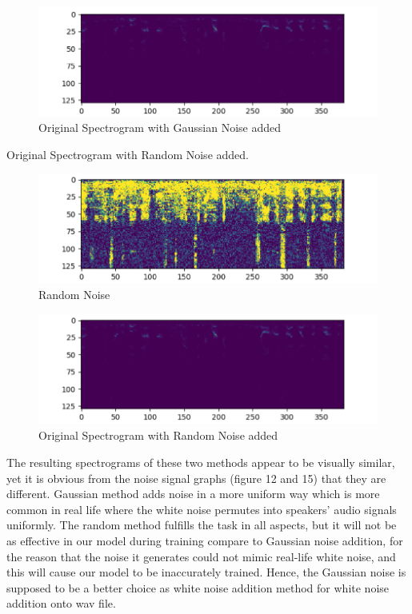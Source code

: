 \documentclass[runningheads,a4paper]{llncs}
\begin{document}
\begin{figure}[H]
\includegraphics[scale=0.25]{figureC.png}
\caption{Original Spectrogram with Gaussian Noise added}
\label{fig:framework}
\end{figure}

Original Spectrogram with Random Noise added.\\

\begin{figure}[H]
\includegraphics[scale=0.25]{figureE.png}
\caption{Random Noise}
\label{fig:framework}
\end{figure}

\begin{figure}[H]
\includegraphics[scale=0.25]{figureD.png}
\caption{Original Spectrogram with Random Noise added}
\label{fig:framework}
\end{figure}

The resulting spectrograms of these two methods appear to be visually similar, yet it is obvious from the noise signal graphs (figure 12 and 15) that they are different. Gaussian method adds noise in a more uniform way which is more common in real life where the white noise permutes into speakers’ audio signals uniformly. The random method fulfills the task in all aspects, but it will not be as effective in our model during training compare to Gaussian noise addition, for the reason that the noise it generates could not mimic real-life white noise, and this will cause our model to be inaccurately trained. Hence, the Gaussian noise is supposed to be a better choice as white noise addition method for white noise addition onto wav file.\\
\end{document}
